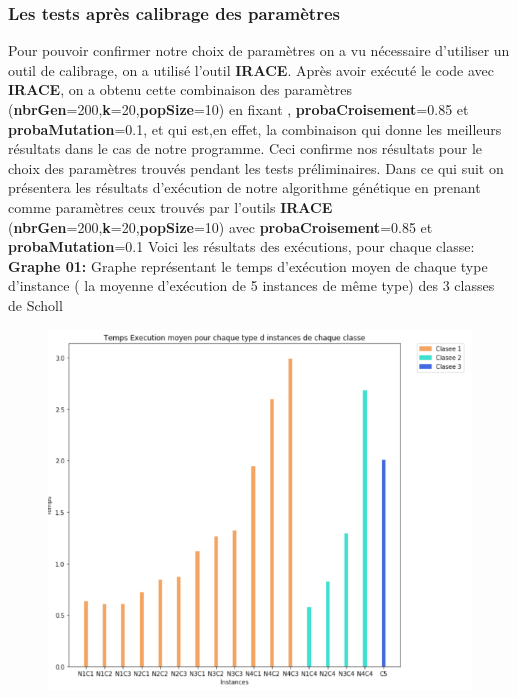 \documentclass{article}
\begin{document}
\subsubsection{Les tests après calibrage des paramètres}
Pour pouvoir confirmer notre choix de paramètres on a vu nécessaire d’utiliser un outil de calibrage, on a utilisé l'outil \textbf{IRACE}. 
\newline
Après avoir exécuté le code avec \textbf{IRACE}, on a obtenu cette combinaison des paramètres (\textbf{nbrGen}=200,\textbf{k}=20,\textbf{popSize}=10) en fixant , \textbf{probaCroisement}=0.85 et \textbf{probaMutation}=0.1, et qui est,en effet, la combinaison qui donne les meilleurs résultats dans le cas de notre programme. Ceci confirme nos résultats pour le choix des paramètres trouvés pendant les tests préliminaires.
\newline
\newline
Dans ce qui suit on présentera les résultats d’exécution de notre algorithme génétique en prenant comme paramètres ceux trouvés par l’outils \textbf{IRACE} (\textbf{nbrGen}=200,\textbf{k}=20,\textbf{popSize}=10) avec \textbf{probaCroisement}=0.85 et \textbf{probaMutation}=0.1
\newline
Voici les résultats des exécutions, pour chaque classe:
\newline
\textbf{Graphe 01:}
Graphe représentant le temps d'exécution moyen de chaque type d’instance ( la moyenne d'exécution de 5 instances de même type) des 3 classes de Scholl
\begin{figure}[H]
  \includegraphics[width=\linewidth]{../figures/pic07.PNG}
\end{figure}
\end{document}
